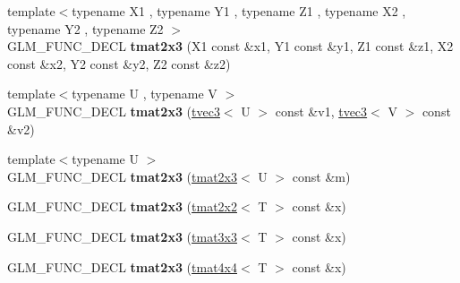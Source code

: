 \begin{DoxyCompactItemize}
\item 
\hypertarget{structglm_1_1detail_1_1tmat2x3_a474ba9a15b1b4b89caacf6171cecb7d6}{}{\footnotesize template$<$typename X1 , typename Y1 , typename Z1 , typename X2 , typename Y2 , typename Z2 $>$ }\\G\+L\+M\+\_\+\+F\+U\+N\+C\+\_\+\+D\+E\+C\+L {\bfseries tmat2x3} (X1 const \&x1, Y1 const \&y1, Z1 const \&z1, X2 const \&x2, Y2 const \&y2, Z2 const \&z2)\label{structglm_1_1detail_1_1tmat2x3_a474ba9a15b1b4b89caacf6171cecb7d6}

\item 
\hypertarget{structglm_1_1detail_1_1tmat2x3_adf8f24014d50e180f069b45470fd3efd}{}{\footnotesize template$<$typename U , typename V $>$ }\\G\+L\+M\+\_\+\+F\+U\+N\+C\+\_\+\+D\+E\+C\+L {\bfseries tmat2x3} (\hyperlink{structglm_1_1detail_1_1tvec3}{tvec3}$<$ U $>$ const \&v1, \hyperlink{structglm_1_1detail_1_1tvec3}{tvec3}$<$ V $>$ const \&v2)\label{structglm_1_1detail_1_1tmat2x3_adf8f24014d50e180f069b45470fd3efd}

\item 
\hypertarget{structglm_1_1detail_1_1tmat2x3_a5f81a32da21791aeb89913e58450beec}{}{\footnotesize template$<$typename U $>$ }\\G\+L\+M\+\_\+\+F\+U\+N\+C\+\_\+\+D\+E\+C\+L {\bfseries tmat2x3} (\hyperlink{structglm_1_1detail_1_1tmat2x3}{tmat2x3}$<$ U $>$ const \&m)\label{structglm_1_1detail_1_1tmat2x3_a5f81a32da21791aeb89913e58450beec}

\item 
\hypertarget{structglm_1_1detail_1_1tmat2x3_a4c1b720d52e5b9a9355c20d68cc9d931}{}G\+L\+M\+\_\+\+F\+U\+N\+C\+\_\+\+D\+E\+C\+L {\bfseries tmat2x3} (\hyperlink{structglm_1_1detail_1_1tmat2x2}{tmat2x2}$<$ T $>$ const \&x)\label{structglm_1_1detail_1_1tmat2x3_a4c1b720d52e5b9a9355c20d68cc9d931}

\item 
\hypertarget{structglm_1_1detail_1_1tmat2x3_ad522db54d8643b0b16ba78b0ccf487eb}{}G\+L\+M\+\_\+\+F\+U\+N\+C\+\_\+\+D\+E\+C\+L {\bfseries tmat2x3} (\hyperlink{structglm_1_1detail_1_1tmat3x3}{tmat3x3}$<$ T $>$ const \&x)\label{structglm_1_1detail_1_1tmat2x3_ad522db54d8643b0b16ba78b0ccf487eb}

\item 
\hypertarget{structglm_1_1detail_1_1tmat2x3_a5942442eefd2c06e0dddfa1304680474}{}G\+L\+M\+\_\+\+F\+U\+N\+C\+\_\+\+D\+E\+C\+L {\bfseries tmat2x3} (\hyperlink{structglm_1_1detail_1_1tmat4x4}{tmat4x4}$<$ T $>$ const \&x)\label{structglm_1_1detail_1_1tmat2x3_a5942442eefd2c06e0dddfa1304680474}


\end{DoxyCompactItemize}
